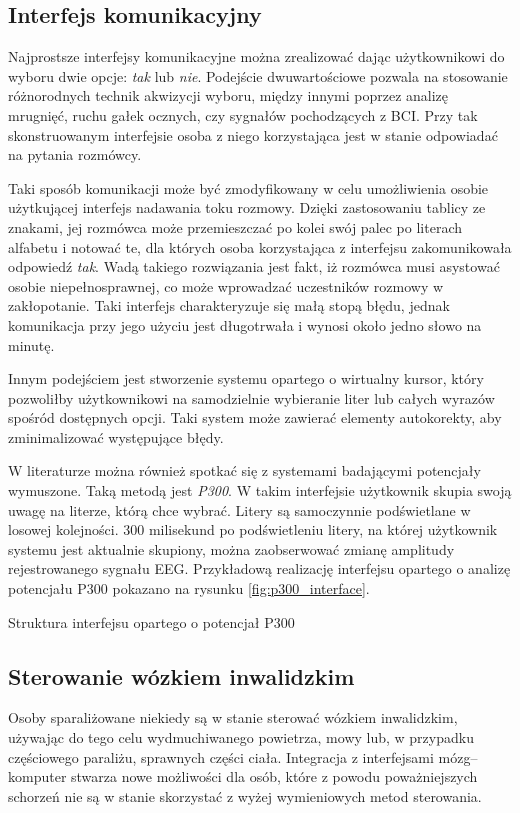 \documentclass[skorowidz,skroty]{dyplomWEZUT}
\begin{document}
\subsection{Interfejs komunikacyjny}
Najprostsze interfejsy komunikacyjne można zrealizować dając użytkownikowi do wyboru dwie opcje: \textit{tak} lub \textit{nie}. Podejście dwuwartościowe pozwala na stosowanie różnorodnych technik akwizycji wyboru, między innymi poprzez analizę mrugnięć, ruchu gałek ocznych, czy sygnałów pochodzących z BCI. Przy tak skonstruowanym interfejsie osoba z niego korzystająca jest w stanie odpowiadać na pytania rozmówcy.

Taki sposób komunikacji może być zmodyfikowany w celu umożliwienia osobie użytkującej interfejs nadawania toku rozmowy. Dzięki zastosowaniu tablicy ze znakami, jej rozmówca może przemieszczać  po kolei swój palec po literach alfabetu i notować te, dla których osoba korzystająca z interfejsu zakomunikowała odpowiedź \textit{tak}. Wadą takiego rozwiązania jest fakt, iż rozmówca musi asystować osobie niepełnosprawnej, co może wprowadzać uczestników rozmowy w zakłopotanie. Taki interfejs charakteryzuje się małą stopą błędu, jednak komunikacja przy jego użyciu jest długotrwała i wynosi około jedno słowo na minutę\cite{bci_trends}.

Innym podejściem jest stworzenie systemu opartego o wirtualny kursor, który pozwoliłby użytkownikowi na samodzielnie wybieranie liter lub całych wyrazów spośród dostępnych opcji. Taki system może zawierać elementy autokorekty, aby zminimalizować występujące błędy.

W literaturze można również spotkać się z systemami badającymi potencjały wymuszone. Taką metodą jest \textit{P300}. W takim interfejsie użytkownik skupia swoją uwagę na literze, którą chce wybrać. Litery są samoczynnie podświetlane w losowej kolejności. 300 milisekund po podświetleniu litery, na której użytkownik systemu jest aktualnie skupiony, można zaobserwować zmianę amplitudy rejestrowanego sygnału EEG\cite{bci_introduction}. Przykładową realizację interfejsu opartego o analizę potencjału P300 pokazano na rysunku \vref{fig:p300_interface}.

{Struktura interfejsu opartego o potencjał P300\label{fig:p300_interface}}
{\cite{p300_interface}}


\subsection{Sterowanie wózkiem inwalidzkim}
Osoby sparaliżowane niekiedy są w stanie sterować wózkiem inwalidzkim, używając do tego celu wydmuchiwanego powietrza, mowy lub, w przypadku częściowego paraliżu, sprawnych części ciała. Integracja z interfejsami mózg--komputer stwarza nowe możliwości dla osób, które z powodu poważniejszych schorzeń nie są w stanie skorzystać z wyżej wymieniowych metod sterowania.
\end{document}
